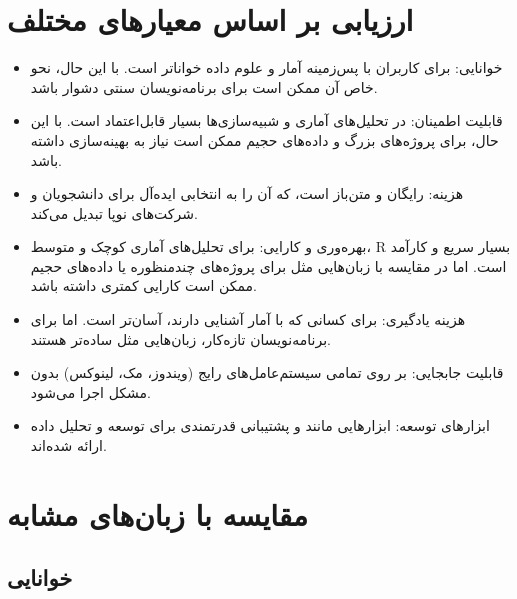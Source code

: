 \documentclass[11pt, a4paper, oneside]{book}
\begin{document}
			
		\section{ارزیابی بر اساس معیارهای مختلف}
			
			\begin{itemize}
				
				\item {\large خوانایی}:
				{\normalsize برای کاربران با پس‌زمینه آمار و علوم داده خواناتر است. با این حال، نحو خاص آن ممکن است برای برنامه‌نویسان سنتی دشوار باشد.}
				
				\item {\large قابلیت اطمینان}:
				{\normalsize در تحلیل‌های آماری و شبیه‌سازی‌ها بسیار قابل‌اعتماد است. با این حال، برای پروژه‌های بزرگ و داده‌های حجیم ممکن است نیاز به بهینه‌سازی داشته باشد.}
				
				\item {\large هزینه}:
				{\normalsize رایگان و متن‌باز است، که آن را به انتخابی ایده‌آل برای دانشجویان و شرکت‌های نوپا تبدیل می‌کند.}
				
				\item {\large بهره‌وری و کارایی}:
				{\normalsize برای تحلیل‌های آماری کوچک و متوسط، R بسیار سریع و کارآمد است. اما در مقایسه با زبان‌هایی مثل  برای پروژه‌های چندمنظوره یا داده‌های حجیم ممکن است کارایی کمتری داشته باشد.}
				
				\item {\large هزینه یادگیری}:
				{\normalsize برای کسانی که با آمار آشنایی دارند، آسان‌تر است. اما برای برنامه‌نویسان تازه‌کار، زبان‌هایی مثل  ساده‌تر هستند.}
				
				\item {\large قابلیت جابجایی}:
				{\normalsize بر روی تمامی سیستم‌عامل‌های رایج (ویندوز، مک، لینوکس) بدون مشکل اجرا می‌شود.}
				
				\item {\large ابزارهای توسعه}:
				{\normalsize ابزارهایی مانند  و  پشتیبانی قدرتمندی برای توسعه و تحلیل داده ارائه شده‌اند‌.}
				
			\end{itemize}
			
		
		
		\section{مقایسه با زبان‌های مشابه}
		
									
			\subsection{خوانایی}
				
\end{document}
